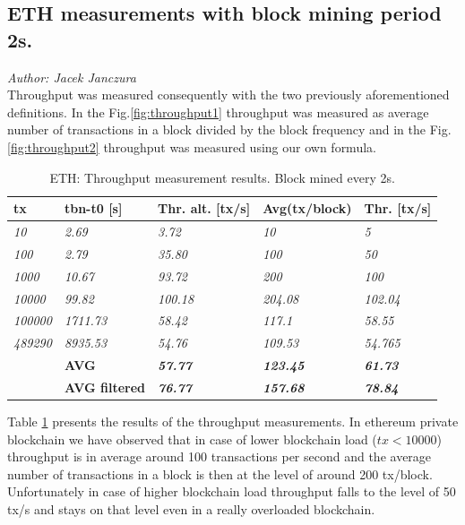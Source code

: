\subsection{ETH measurements with block mining period 2s.}

\textit{Author: Jacek Janczura} \\
Throughput was measured consequently with the two previously aforementioned definitions. In the Fig.\ref{fig:throughput1} throughput was measured as average number of transactions in a block divided by the block frequency and in the Fig.\ref{fig:throughput2} throughput was measured using our own formula.
 
\begin{table}[!h]
\centering
\begin{tabular}{l|l|l|l|l|}
\hline
\multicolumn{1}{|l|}{\textbf{tx}} & \textbf{tbn-t0 {[}s{]}} & \textbf{Thr. alt. {[}tx/s{]}} & \textbf{Avg(tx/block)} & \textbf{Thr. {[}tx/s{]}} \\ \hline
\multicolumn{1}{|l|}{\textit{10}} & \textit{2.69} & \textit{3.72} & \textit{10} & \textit{5} \\ \hline
\multicolumn{1}{|l|}{\textit{100}} & \textit{2.79} & \textit{35.80} & \textit{100} & \textit{50} \\ \hline
\multicolumn{1}{|l|}{\textit{1000}} & \textit{10.67} & \textit{93.72} & \textit{200} & \textit{100} \\ \hline
\multicolumn{1}{|l|}{\textit{10000}} & \textit{99.82} & \textit{100.18} & \textit{204.08} & \textit{102.04} \\ \hline
\multicolumn{1}{|l|}{\textit{100000}} & \textit{1711.73} & \textit{58.42} & \textit{117.1} & \textit{58.55} \\ \hline
\multicolumn{1}{|l|}{\textit{489290}} & \textit{8935.53} & \textit{54.76} & \textit{109.53} & \textit{54.765} \\ \hline
& \textbf{AVG} & \textit{\textbf{57.77}} & \textit{\textbf{123.45}} & \textit{\textbf{61.73}} \\ \cline{2-5}
& \textbf{AVG filtered} & \textit{\textbf{76.77}} & \textit{\textbf{157.68}} & \textit{\textbf{78.84}} \\ \cline{2-5}
\end{tabular}
\caption{ETH: Throughput measurement results. Block mined every 2s.}
\label{table:2}
\end{table}
 
Table \ref{table:2} presents the results of the throughput measurements. In ethereum private blockchain we have observed that in case of lower blockchain load ($tx < 10000$) throughput is in average around 100 transactions per second and the average number of transactions in a block is then at the level of around 200 tx/block. Unfortunately in case of higher blockchain load  throughput falls to the level of 50 tx/s and stays on that level even in a really overloaded blockchain.
 
